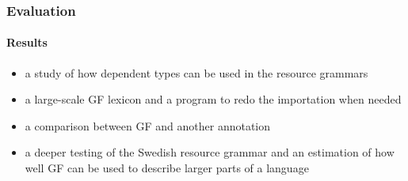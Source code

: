 \documentclass[10pt]{beamer}
\renewcommand{\baselinestretch}{1.5}
\begin{document}
%
%
%

\begin{frame}
 \renewcommand{\baselinestretch}{1.0}
\frametitle{Evaluation}
\framesubtitle{Results} 
\begin{itemize}
\item a study of how dependent types can be used in the resource grammars
\item a large-scale GF lexicon and a program to redo the importation when needed
\item a comparison between GF and another annotation
\item a deeper testing of the Swedish resource grammar and an estimation
of how well GF can be used to describe larger parts of a language
\end{itemize}
\end{frame}




\end{document}
